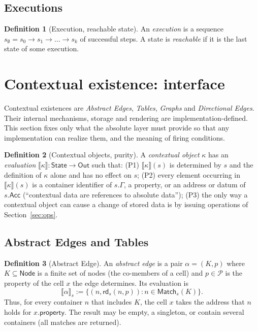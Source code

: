 \documentclass[11pt,a4paper]{article}
\theoremstyle{definition}
\newtheorem{definition}{Definition}[section]
\theoremstyle{plain}
\theoremstyle{remark}
\newcommand{\Prp}{\mathcal{P}}
\newcommand{\Nod}{\mathsf{Node}}
\newcommand{\Stt}{\mathsf{State}}
\newcommand{\rd}{\mathsf{rd}}
\newcommand{\Match}{\mathsf{Match}}
\newcommand{\Acc}{\mathsf{Acc}}
\begin{document}
\subsection{Executions}

\begin{definition}[Execution, reachable state]
An \emph{execution} is a sequence $s_\emptyset=s_0\to s_1\to\dots\to s_k$ of successful steps.
A state is \emph{reachable} if it is the last state of some execution.
\end{definition}

\section{Contextual existence: interface}
\label{sec:ctx}

Contextual existences are \emph{Abstract Edges}, \emph{Tables}, \emph{Graphs} and \emph{Directional Edges}.
Their internal mechanisms, storage and rendering are implementation-defined.
This section fixes only what the absolute layer must provide so that any implementation can realize them, and the meaning of firing conditions.

\begin{definition}[Contextual objects, purity]\label{def:purity}
A \emph{contextual object} $\kappa$ has an \emph{evaluation} $\llbracket\kappa\rrbracket:\Stt\to\mathsf{Out}$ such that:
(P1) $\llbracket\kappa\rrbracket(s)$ is determined by $s$ and the definition of $\kappa$ alone and has no effect on $s$;
(P2) every element occurring in $\llbracket\kappa\rrbracket(s)$ is a container identifier of $s.\Gamma$, a property, or an address or datum of $s.\Acc$ (``contextual data are references to absolute data'');
(P3) the only way a contextual object can cause a change of stored data is by issuing operations of Section~\ref{sec:ops}.
\end{definition}

\subsection{Abstract Edges and Tables}

\begin{definition}[Abstract Edge]\label{def:aedge}
An \emph{abstract edge} is a pair $\alpha=(K,p)$ where $K\subseteq\Nod$ is a finite set of nodes (the co-members of a cell) and $p\in\Prp$ is the property of the cell $x$ the edge determines. Its evaluation is
\[
\llbracket\alpha\rrbracket_s:=\{(n,\rd_s(n,p)) : n\in\Match_s(K)\}.
\]
Thus, for every container $n$ that includes $K$, the cell $x$ takes the address that $n$ holds for $x.\mathsf{property}$.
The result may be empty, a singleton, or contain several containers (all matches are returned).
\end{definition}
\end{document}
